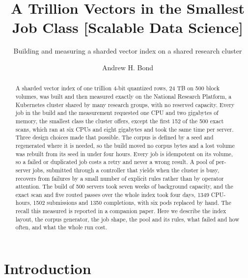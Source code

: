 \documentclass[sigconf, nonacm]{acmart}
\begin{document}
\title{A Trillion Vectors in the Smallest Job Class [Scalable Data Science]}
\subtitle{Building and measuring a sharded vector index on a shared research cluster}

\author{Andrew H. Bond}

\begin{abstract}
A sharded vector index of one trillion 4-bit quantized rows, 24 TB on 500 block volumes, was built
and then measured exactly on the National Research Platform, a Kubernetes cluster shared by many
research groups, with no reserved capacity. Every job in the build and the measurement requested
one CPU and two gigabytes of memory, the smallest class the cluster offers, except the first 152
of the 500 exact scans, which ran at six CPUs and eight gigabytes and took the same time per
server. Three design choices
made that possible. The corpus is defined by a seed and regenerated where it is needed, so the
build moved no corpus bytes and a lost volume was rebuilt from its seed in under four hours. Every
job is idempotent on its volume, so a failed or duplicated job costs a retry and never a wrong
result. A pool of per-server jobs, submitted through a controller that yields when the cluster is
busy, recovers from failures by a small number of explicit rules rather than by operator
attention. The build of 500 servers took seven weeks of background capacity, and the exact scan
and five routed passes over the whole index took four days, 1349 CPU-hours, 1502 submissions and
1350 completions, with six pods replaced by hand. The recall this measured is reported in a
companion paper. Here we describe the index layout, the corpus generator, the job shape, the pool
and its rules, what failed and how often, and what the whole run cost.
\end{abstract}

\maketitle

\vldbtopmatter

\section{Introduction}
\end{document}
